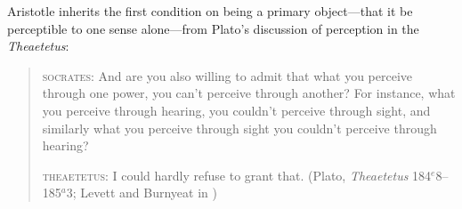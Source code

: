 Aristotle inherits the first condition on being a primary object---that it be perceptible to one sense alone---from Plato's discussion of perception in the \emph{Theaetetus}:
\begin{quotation}
	\textsc{socrates}: And are you also willing to admit that what you perceive through one power, you can't perceive through another? For instance, what you perceive through hearing, you couldn't perceive through sight, and similarly what you perceive through sight you couldn't perceive through hearing?
	
	\textsc{theaetetus}: I could hardly refuse to grant that. (Plato, \emph{Theaetetus} 184\( ^{e} \)8--185\( ^{a} \)3; Levett and Burnyeat in \citealt[204]{Cooper:1997fk})
\end{quotation}
